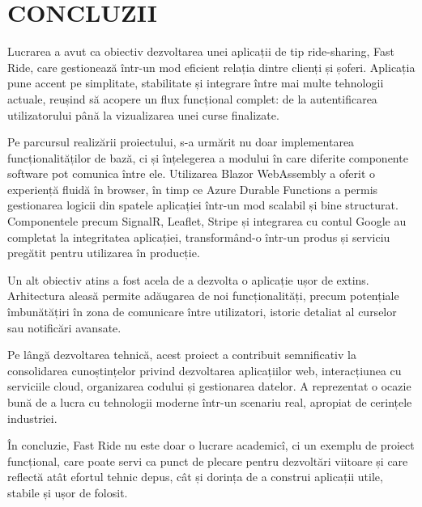 \chapter{CONCLUZII}
Lucrarea a avut ca obiectiv dezvoltarea unei aplicații de tip ride-sharing, Fast Ride, care gestionează într-un mod eficient relația dintre clienți și șoferi. Aplicația pune accent pe simplitate, stabilitate și integrare între mai multe tehnologii actuale, reușind să acopere un flux funcțional complet: de la autentificarea utilizatorului până la vizualizarea unei curse finalizate.

Pe parcursul realizării proiectului, s-a urmărit nu doar implementarea funcționalităților de bază, ci și înțelegerea a modului în care diferite componente software pot comunica între ele. Utilizarea Blazor WebAssembly a oferit o experiență fluidă în browser, în timp ce Azure Durable Functions a permis gestionarea logicii din spatele aplicației într-un mod scalabil și bine structurat. Componentele precum SignalR, Leaflet, Stripe și integrarea cu contul Google au completat la integritatea aplicației, transformând-o într-un produs și serviciu pregătit pentru utilizarea în producție.

Un alt obiectiv atins a fost acela de a dezvolta o aplicație ușor de extins. Arhitectura aleasă permite adăugarea de noi funcționalități, precum potențiale îmbunătățiri în zona de comunicare între utilizatori, istoric detaliat al curselor sau notificări avansate.

Pe lângă dezvoltarea tehnică, acest proiect a contribuit semnificativ la consolidarea cunoștințelor privind dezvoltarea aplicațiilor web, interacțiunea cu serviciile cloud, organizarea codului și gestionarea datelor. A reprezentat o ocazie bună de a lucra cu tehnologii moderne într-un scenariu real, apropiat de cerințele industriei.

În concluzie, Fast Ride nu este doar o lucrare academicî, ci un exemplu de proiect funcțional, care poate servi ca punct de plecare pentru dezvoltări viitoare și care reflectă atât efortul tehnic depus, cât și dorința de a construi aplicații utile, stabile și ușor de folosit.